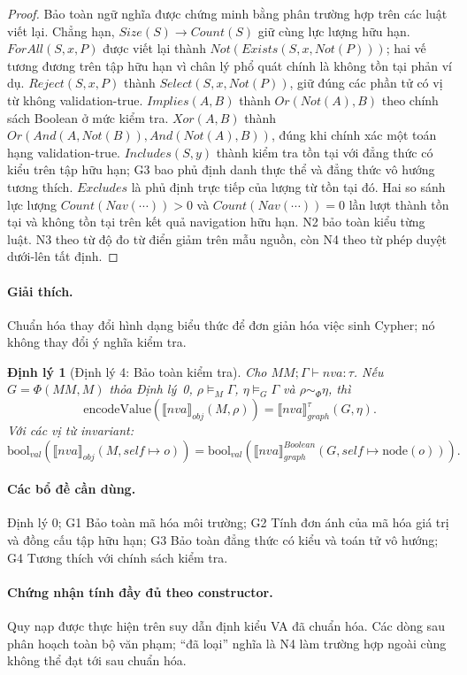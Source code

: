 \documentclass[11pt,a4paper]{article}
\newtheorem{theorem}{Định lý}
\theoremstyle{definition}
\newcommand{\node}{\mathrm{node}}
\newcommand{\PhiEnc}{\Phi}
\newcommand{\boolval}{\mathrm{bool}_{val}}
\newcommand{\encodeValue}{\mathrm{encodeValue}}
\newcommand{\sem}[2]{\llbracket #1 \rrbracket_{#2}}
\begin{document}
\begin{proof}
Bảo toàn ngữ nghĩa được chứng minh bằng phân trường hợp trên các luật viết lại.
Chẳng hạn, $Size(S)\to Count(S)$ giữ cùng lực lượng hữu hạn.
$ForAll(S,x,P)$ được viết lại thành $Not(Exists(S,x,Not(P)))$; hai vế tương
đương trên tập hữu hạn vì chân lý phổ quát chính là không tồn tại phản ví dụ.
$Reject(S,x,P)$ thành $Select(S,x,Not(P))$, giữ đúng các phần tử có vị từ không
validation-true. $Implies(A,B)$ thành $Or(Not(A),B)$ theo chính sách Boolean ở
mức kiểm tra. $Xor(A,B)$ thành
$Or(And(A,Not(B)),And(Not(A),B))$, đúng khi chính xác một toán hạng
validation-true. $Includes(S,y)$ thành kiểm tra tồn tại với đẳng thức có kiểu trên
tập hữu hạn; G3 bao phủ định danh thực thể và đẳng thức vô hướng tương thích.
$Excludes$ là phủ định trực tiếp của lượng từ tồn tại đó. Hai so sánh lực lượng
$Count(Nav(\cdots))>0$ và $Count(Nav(\cdots))=0$ lần lượt thành tồn tại và
không tồn tại trên kết quả navigation hữu hạn. N2 bảo toàn kiểu từng luật. N3
theo từ độ đo từ điển giảm trên mẫu nguồn, còn N4 theo từ phép duyệt dưới-lên
tất định.
\end{proof}

\paragraph{Giải thích.}
Chuẩn hóa thay đổi hình dạng biểu thức để đơn giản hóa việc sinh Cypher; nó
không thay đổi ý nghĩa kiểm tra.

\begin{theorem}[Định lý 4: Bảo toàn kiểm tra]
Cho $MM;\Gamma\vdash nva:\tau$. Nếu $G=\PhiEnc(MM,M)$ thỏa Định lý~0,
$\rho\models_M\Gamma$, $\eta\models_G\Gamma$ và
$\rho\sim_{\Phi}\eta$, thì
\[
\encodeValue(\sem{nva}{obj}(M,\rho))=\sem{nva}{graph}^{\tau}(G,\eta).
\]
Với các vị từ invariant:
\[
\boolval(\sem{nva}{obj}(M,self\mapsto o))
=
\boolval(\sem{nva}{graph}^{Boolean}(G,self\mapsto \node(o))).
\]
\end{theorem}

\paragraph{Các bổ đề cần dùng.}
Định lý 0; G1 Bảo toàn mã hóa môi trường; G2 Tính đơn ánh của mã hóa giá trị và
đồng cấu tập hữu hạn; G3 Bảo toàn đẳng thức có kiểu và toán tử vô hướng; G4
Tương thích với chính sách kiểm tra.

\paragraph{Chứng nhận tính đầy đủ theo constructor.}
Quy nạp được thực hiện trên suy dẫn định kiểu VA đã chuẩn hóa. Các dòng sau
phân hoạch toàn bộ văn phạm; ``đã loại'' nghĩa là N4 làm trường hợp ngoài cùng
không thể đạt tới sau chuẩn hóa.
\end{document}
